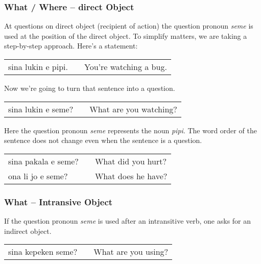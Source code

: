 \subsubsection*{What / Where -- direct Object}
%
At questions on direct object (recipient of action) the question pronoun \textit{seme} is used at the position of the direct object.
To simplify matters, we are taking a step-by-step approach.
Here's a statement:

\begin{supertabular}{p{5,5cm}|ll}
sina lukin e pipi. && You're watching a bug. \\
\end{supertabular} 

Now we're going to turn that sentence into a question. 

\begin{supertabular}{p{5,5cm}|ll}
sina lukin e seme? && What are you watching? \\
\end{supertabular} 

Here the question pronoun \textit{seme} represents the noun \textit{pipi}. 
The word order of the sentence does not change even when the sentence is a question. 

\begin{supertabular}{p{5,5cm}|ll}
sina pakala e seme? && What did you hurt? \\
ona li jo e seme? && What does he have? \\
\end{supertabular} 
%
\subsubsection*{What -- Intransive Object}

If the question pronoun \textit{seme} is used after an intransitive verb, one asks for an indirect object. 

\begin{supertabular}{p{5,5cm}|ll}
sina kepeken seme? && What are you using? \\
\end{supertabular} 
%
